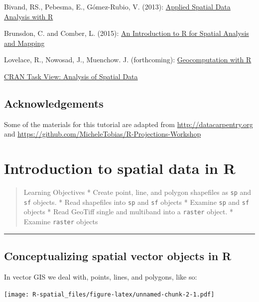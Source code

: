 \documentclass[]{book}
\theoremstyle{definition}
\theoremstyle{definition}
\theoremstyle{definition}
\theoremstyle{remark}
\begin{document}
Bivand, RS., Pebesma, E., Gómez-Rubio, V. (2013):
\href{https://link.springer.com/book/10.1007\%2F978-1-4614-7618-4}{Applied
Spatial Data Analysis with R}

Brunsdon, C. and Comber, L. (2015):
\href{https://us.sagepub.com/en-us/nam/an-introduction-to-r-for-spatial-analysis-and-mapping/book241031}{An
Introduction to R for Spatial Analysis and Mapping}

Lovelace, R., Nowosad, J., Muenchow. J. (forthcoming):
\href{https://geocompr.robinlovelace.net}{Geocomputation with R}

\href{https://CRAN.R-project.org/view=Spatial}{CRAN Task View: Analysis
of Spatial Data}

\section*{Acknowledgements}\label{acknowledgements}

Some of the materials for this tutorial are adapted from
\url{http://datacarpentry.org} and
\url{https://github.com/MicheleTobias/R-Projections-Workshop}

\chapter{Introduction to spatial data in R}\label{intro}

\begin{quote}
Learning Objectives * Create point, line, and polygon shapefiles as
\texttt{sp} and \texttt{sf} objects. * Read shapefiles into \texttt{sp}
and \texttt{sf} objects * Examine \texttt{sp} and \texttt{sf} objects *
Read GeoTiff single and multiband into a \texttt{raster} object. *
Examine \texttt{raster} objects
\end{quote}

\begin{center}\rule{0.5\linewidth}{\linethickness}\end{center}

\section{Conceptualizing spatial vector objects in
R}\label{conceptualizing-spatial-vector-objects-in-r}

In vector GIS we deal with, points, lines, and polygons, like so:

\texttt{[image: R-spatial\_files/figure-latex/unnamed-chunk-2-1.pdf]}
\end{document}
